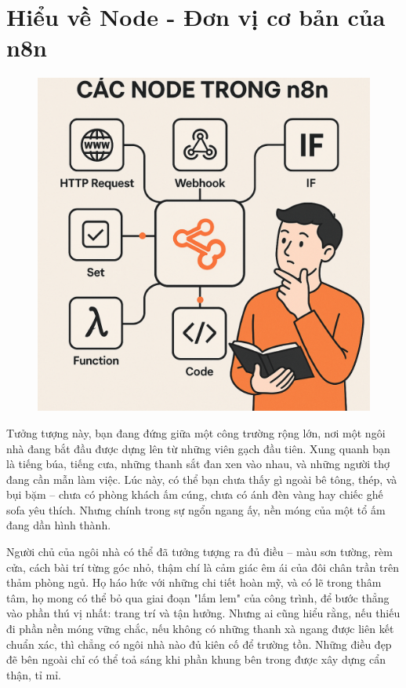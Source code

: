 \chapter{Hiểu về Node - Đơn vị cơ bản của n8n}

\begin{figure}[htbp]
    \centering
    \includegraphics[width=0.96\linewidth]{Chap1-7/node-mh.pdf}
\end{figure}



Tưởng tượng này, bạn đang đứng giữa một công trường rộng lớn, nơi một ngôi nhà đang bắt đầu được dựng lên từ những viên gạch đầu tiên. Xung quanh bạn là tiếng búa, tiếng cưa, những thanh sắt đan xen vào nhau, và những người thợ đang cần mẫn làm việc. Lúc này, có thể bạn chưa thấy gì ngoài bê tông, thép, và bụi bặm – chưa có phòng khách ấm cúng, chưa có ánh đèn vàng hay chiếc ghế sofa yêu thích. Nhưng chính trong sự ngổn ngang ấy, nền móng của một tổ ấm đang dần hình thành.

Người chủ của ngôi nhà có thể đã tưởng tượng ra đủ điều – màu sơn tường, rèm cửa, cách bài trí từng góc nhỏ, thậm chí là cảm giác êm ái của đôi chân trần trên thảm phòng ngủ. Họ háo hức với những chi tiết hoàn mỹ, và có lẽ trong thâm tâm, họ mong có thể bỏ qua giai đoạn "lấm lem" của công trình, để bước thẳng vào phần thú vị nhất: trang trí và tận hưởng. Nhưng ai cũng hiểu rằng, nếu thiếu đi phần nền móng vững chắc, nếu không có những thanh xà ngang được liên kết chuẩn xác, thì chẳng có ngôi nhà nào đủ kiên cố để trường tồn. Những điều đẹp đẽ bên ngoài chỉ có thể toả sáng khi phần khung bên trong được xây dựng cẩn thận, tỉ mỉ.

